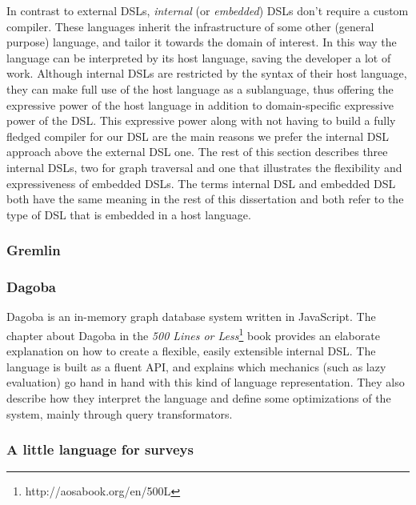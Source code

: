 In contrast to external DSLs, \textit{internal} (or \textit{embedded}\cite{Hudak:1996}) DSLs don't require a custom compiler. These languages inherit the infrastructure of some other (general purpose) language, and tailor it towards the domain of interest. In this way the language can be interpreted by its host language, saving the developer a lot of work. Although internal DSLs are restricted by the syntax of their host language, they can make full use of the host language as a sublanguage, thus offering the expressive power of the host language in addition to domain-specific expressive power of the DSL. This expressive power along with not having to build a fully fledged compiler for our DSL are the main reasons we prefer the internal DSL approach above the external DSL one. The rest of this section describes three internal DSLs, two for graph traversal and one that illustrates the flexibility and expressiveness of embedded DSLs. The terms internal DSL and embedded DSL both have the same meaning in the rest of this dissertation and both refer to the type of DSL that is embedded in a host language.

\subsubsection*{Gremlin}


\subsubsection*{Dagoba}

Dagoba is an in-memory graph database system written in JavaScript. The chapter about Dagoba in the \textit{500 Lines or Less}\footnote{http://aosabook.org/en/500L} book provides an elaborate explanation on how to create a flexible, easily extensible internal DSL. The language is built as a fluent API, and explains which mechanics (such as lazy evaluation) go hand in hand with this kind of language representation. They also describe how they interpret the language and define some optimizations of the system, mainly through query transformators.

\subsubsection*{A little language for surveys}

